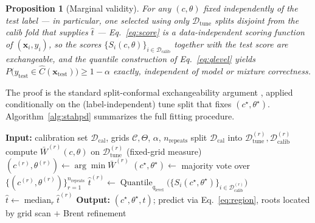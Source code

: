 \documentclass[10pt,twocolumn,a4paper]{article}
\newtheorem{proposition}{Proposition}
\begin{document}
\begin{proposition}[Marginal validity]
\label{prop:validity}
For any $(c,\theta)$ fixed independently of the test label — in particular, one selected using
only $\mathcal D_{\mathrm{tune}}$ splits disjoint from the calib fold that supplies $\hat t$ —
Eq.~\eqref{eq:score} is a data-independent scoring function of $(\bm x_i,y_i)$, so the scores
$\{S_i(c,\theta)\}_{i\in\mathcal D_{\mathrm{calib}}}$ together with the test score are exchangeable,
and the quantile construction of Eq.~\eqref{eq:qlevel} yields
$P\big(y_{\mathrm{test}}\in \hat C(\bm x_{\mathrm{test}})\big)\ge 1-\alpha$ exactly, independent of
model or mixture correctness.
\end{proposition}

The proof is the standard split-conformal exchangeability argument \cite{vovk2005algorithmic},
applied conditionally on the (label-independent) tune split that fixes $(c^\star,\theta^\star)$.
Algorithm~\ref{alg:stahpd} summarizes the full fitting procedure.

\begin{algorithm}[t]
\caption{STA-HPD fitting}
\label{alg:stahpd}
\begin{algorithmic}[1]
\State \textbf{Input:} calibration set $\mathcal D_{\mathrm{cal}}$, grids $\mathcal C,\Theta$, $\alpha$, $n_{\mathrm{repeats}}$
  \State split $\mathcal D_{\mathrm{cal}}$ into $\mathcal D_{\mathrm{tune}}^{(r)}, \mathcal D_{\mathrm{calib}}^{(r)}$
    \State compute $\bar W^{(r)}(c,\theta)$ on $\mathcal D_{\mathrm{tune}}^{(r)}$ (fixed-grid measure)
  \EndFor
  \State $(c^{(r)},\theta^{(r)}) \gets \arg\min \bar W^{(r)}$
\EndFor
\State $(c^\star,\theta^\star) \gets$ majority vote over $\{(c^{(r)},\theta^{(r)})\}_{r=1}^{n_{\mathrm{repeats}}}$
  \State $\hat t^{(r)} \gets \operatorname{Quantile}_{q_{\mathrm{level}}}\big(\{S_i(c^\star,\theta^\star)\}_{i\in\mathcal D_{\mathrm{calib}}^{(r)}}\big)$
\EndFor
\State $\hat t \gets \operatorname{median}_r \hat t^{(r)}$
\State \textbf{Output:} $(c^\star,\theta^\star,\hat t)$; predict via Eq.~\eqref{eq:region}, roots located by grid scan $+$ Brent refinement
\end{algorithmic}
\end{algorithm}
\end{document}
